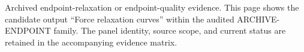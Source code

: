 Archived endpoint-relaxation or endpoint-quality evidence. This page shows the candidate output ``Force relaxation curves'' within the audited ARCHIVE-ENDPOINT family. The panel identity, source scope, and current status are retained in the accompanying evidence matrix.
